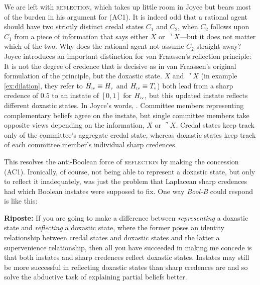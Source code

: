 \documentclass[11pt]{article}
\newcommand{\augustin}[0]{\textit{Bool-B}}
\begin{document}
We are left with \textsc{reflection}, which takes up little room in
Joyce but bears most of the burden in his argument for (AC1). It is
indeed odd that a rational agent should have two strictly distinct
credal states $C_{1}$ and $C_{2}$, when $C_{2}$ follows upon $C_{1}$
from a piece of information that says either $X$ or
$\urcorner{}X$---but it does not matter which of the two. Why does the
rational agent not assume $C_{2}$ straight away? Joyce introduces an
important distinction for van Fraassen's reflection principle: It is
not the degree of credence that is decisive as in van Fraassen's
original formulation of the principle, but the doxastic state. $X$ and
$\urcorner{}X$ (in example \ref{ex:dilation}, they refer to
$H_{\mbox{\tiny{iv}}}\equiv{}H_{\mbox{\tiny{v}}}$ and
$H_{\mbox{\tiny{iv}}}\equiv{}T_{\mbox{\tiny{v}}}$) both lead from a
sharp credence of $0.5$ to an instate of $[0,1]$ for
$H_{\mbox{\tiny{iv}}}$, but this updated instate reflects different
doxastic states. In Joyce's words, 
. Committee members representing complementary
beliefs agree on the instate, but single committee members take
opposite views depending on the information, $X$ or $\urcorner{}X$.
Credal states keep track only of the committee's aggregate credal
state, whereas doxastic states keep track of each committee member's
individual sharp credences.

This resolves the anti-Boolean force of \textsc{reflection} by making
the concession (AC1). Ironically, of course, not being able to
represent a doxastic state, but only to reflect it inadequately, was
just the problem that Laplacean sharp credences had which Boolean
instates were supposed to fix. One way {\augustin} could respond is
like this:

\begin{quotex}
  \textbf{Riposte:} If you are going to make a difference between
  \emph{representing} a doxastic state and \emph{reflecting} a
  doxastic state, where the former poses an identity relationship
  between credal states and doxastic states and the latter a
  supervenience relationship, then all you have succeeded in making me
  concede is that both instates and sharp credences reflect doxastic
  states. Instates may still be more successful in reflecting doxastic
  states than sharp credences are and so solve the abductive task of
  explaining partial beliefs better.
\end{quotex}
\end{document}
